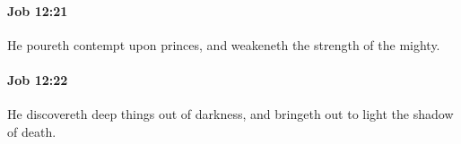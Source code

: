 		\paragraph{Job 12:21} %
			\label{JOB-12-21}

			He poureth contempt upon princes, and weakeneth the strength of the mighty.


		\paragraph{Job 12:22} %
			\label{JOB-12-22}

			He discovereth deep things out of darkness, and bringeth out to light the shadow of death.


